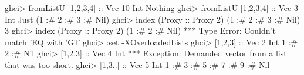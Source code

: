 \documentclass[]{article}
\newenvironment{Shaded}{}{}
\newcommand{\DataTypeTok}[1]{\textcolor[rgb]{0.56,0.13,0.00}{{#1}}}
\newcommand{\DecValTok}[1]{\textcolor[rgb]{0.25,0.63,0.44}{{#1}}}
\newcommand{\CharTok}[1]{\textcolor[rgb]{0.25,0.44,0.63}{{#1}}}
\newcommand{\OtherTok}[1]{\textcolor[rgb]{0.00,0.44,0.13}{{#1}}}
\newcommand{\FunctionTok}[1]{\textcolor[rgb]{0.02,0.16,0.49}{{#1}}}
\newcommand{\NormalTok}[1]{{#1}}
\begin{document}
\begin{Shaded}
\begin{Highlighting}[]
\NormalTok{ghci}\FunctionTok{>} \NormalTok{fromListU [}\DecValTok{1}\NormalTok{,}\DecValTok{2}\NormalTok{,}\DecValTok{3}\NormalTok{,}\DecValTok{4}\NormalTok{]}\OtherTok{ ::} \DataTypeTok{Vec} \DecValTok{10} \DataTypeTok{Int}
\DataTypeTok{Nothing}
\NormalTok{ghci}\FunctionTok{>} \NormalTok{fromListU [}\DecValTok{1}\NormalTok{,}\DecValTok{2}\NormalTok{,}\DecValTok{3}\NormalTok{,}\DecValTok{4}\NormalTok{]}\OtherTok{ ::} \DataTypeTok{Vec} \DecValTok{3} \DataTypeTok{Int}
\DataTypeTok{Just} \NormalTok{(}\DecValTok{1} \FunctionTok{:#} \DecValTok{2} \FunctionTok{:#} \DecValTok{3} \FunctionTok{:#} \DataTypeTok{Nil}\NormalTok{)}
\NormalTok{ghci}\FunctionTok{>} \NormalTok{index (}\DataTypeTok{Proxy}\OtherTok{ ::} \DataTypeTok{Proxy} \DecValTok{2}\NormalTok{) (}\DecValTok{1} \FunctionTok{:#} \DecValTok{2} \FunctionTok{:#} \DecValTok{3} \FunctionTok{:#} \DataTypeTok{Nil}\NormalTok{)}
\DecValTok{3}
\NormalTok{ghci}\FunctionTok{>} \NormalTok{index (}\DataTypeTok{Proxy}\OtherTok{ ::} \DataTypeTok{Proxy} \DecValTok{2}\NormalTok{) (}\DecValTok{1} \FunctionTok{:#} \DecValTok{2} \FunctionTok{:#} \DataTypeTok{Nil}\NormalTok{)}
\FunctionTok{***} \DataTypeTok{Type} \DataTypeTok{Error}\FunctionTok{:} \DataTypeTok{Couldn't} \NormalTok{match }\CharTok{'EQ with '}\DataTypeTok{GT}
\NormalTok{ghci}\FunctionTok{>} \FunctionTok{:}\NormalTok{set }\FunctionTok{-}\DataTypeTok{XOverloadedLists}
\NormalTok{ghci}\FunctionTok{>} \NormalTok{[}\DecValTok{1}\NormalTok{,}\DecValTok{2}\NormalTok{,}\DecValTok{3}\NormalTok{]}\OtherTok{ ::} \DataTypeTok{Vec} \DecValTok{2} \DataTypeTok{Int}
\DecValTok{1} \FunctionTok{:#} \DecValTok{2} \FunctionTok{:#} \DataTypeTok{Nil}
\NormalTok{ghci}\FunctionTok{>} \NormalTok{[}\DecValTok{1}\NormalTok{,}\DecValTok{2}\NormalTok{,}\DecValTok{3}\NormalTok{]}\OtherTok{ ::} \DataTypeTok{Vec} \DecValTok{4} \DataTypeTok{Int}
\FunctionTok{***} \DataTypeTok{Exception}\FunctionTok{:} \DataTypeTok{Demanded} \NormalTok{vector from a list that was too short}\FunctionTok{.}
\NormalTok{ghci}\FunctionTok{>} \NormalTok{[}\DecValTok{1}\NormalTok{,}\DecValTok{3}\FunctionTok{..}\NormalTok{]}\OtherTok{ ::} \DataTypeTok{Vec} \DecValTok{5} \DataTypeTok{Int}
\DecValTok{1} \FunctionTok{:#} \DecValTok{3} \FunctionTok{:#} \DecValTok{5} \FunctionTok{:#} \DecValTok{7} \FunctionTok{:#} \DecValTok{9} \FunctionTok{:#} \DataTypeTok{Nil}
\end{Highlighting}
\end{Shaded}
\end{document}
